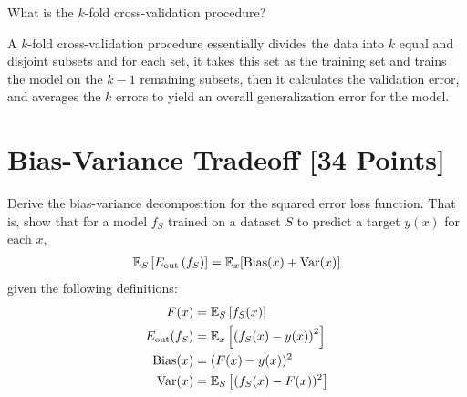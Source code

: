 \documentclass{article}
\begin{document}
\begin{problem}[2]
  What is the $k$-fold cross-validation procedure?
\end{problem}
\begin{solution}
  A $k$-fold cross-validation procedure essentially divides the data into $k$ equal and disjoint subsets and for each set, it takes this set as the training set and   trains the model on the $k-1$ remaining subsets, then it calculates the validation error, and averages the $k$ errors to yield an overall generalization error for the model. 
\end{solution}




\newpage
\section{Bias-Variance Tradeoff [34 Points]}

\begin{problem}[5]
  Derive the bias-variance decomposition for the squared error loss function. That is, show that for a model $f_S$ trained on a dataset $S$ to predict a target $y(x)$ for each $x$,
  \begin{align*}
    \mathbb{E}_S \left[E_\text{out}\left(f_S\right)\right] = \mathbb{E}_x[\operatorname{Bias}(x) + \operatorname{Var}(x)]
  \end{align*}
  given the following definitions:
  \begin{align*}
    F(x) &= \mathbb{E}_S\left[f_S(x) \right] \\
    E_\text{out}(f_S) &= \mathbb{E}_x\left[\left(f_S(x) - y(x)\right)^2\right] \\
    \operatorname{Bias}(x) &= (F(x) - y(x))^2 \\
    \operatorname{Var}(x) &= \mathbb{E}_S\left[(f_S(x)-F(x))^2\right]
  \end{align*}
\end{problem}
\end{document}
